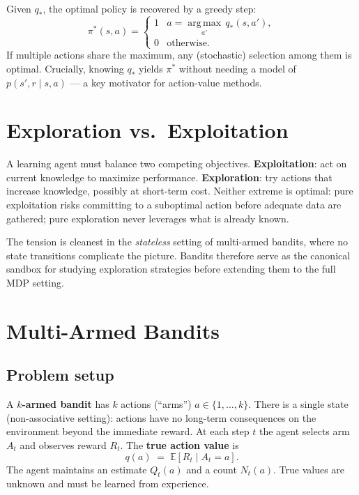 \documentclass[11pt, oneside]{book}
\newcommand{\E}{\mathbb{E}}              %
\newcommand{\argmax}{\operatorname*{arg\,max}}
\newcommand{\qstar}{q_{*}}               %
\begin{document}
Given $\qstar$, the optimal policy is recovered by a greedy step:
\[
  \pi^*(s, a) =
  \begin{cases}
    1 & a = \argmax_{a'}\, \qstar(s, a'), \\
    0 & \text{otherwise.}
  \end{cases}
\]
If multiple actions share the maximum, any (stochastic) selection among them is optimal.
Crucially, knowing $\qstar$ yields $\pi^*$ without needing a model of
$p(s',r \mid s,a)$ --- a key motivator for action-value methods.

\section{Exploration vs.\ Exploitation}

A learning agent must balance two competing objectives.
\textbf{Exploitation}: act on current knowledge to maximize performance.
\textbf{Exploration}: try actions that increase knowledge, possibly at short-term cost.
Neither extreme is optimal: pure exploitation risks committing to a suboptimal action
before adequate data are gathered; pure exploration never leverages what is already known.

The tension is cleanest in the \emph{stateless} setting of multi-armed bandits, where
no state transitions complicate the picture.
Bandits therefore serve as the canonical sandbox for studying exploration strategies
before extending them to the full MDP setting.

\section{Multi-Armed Bandits}

\subsection{Problem setup}

\begin{defbox}[title={$k$-Armed Bandit}]
A \textbf{$k$-armed bandit} has $k$ actions (``arms'') $a \in \{1,\dots,k\}$.
There is a single state (non-associative setting): actions have no long-term
consequences on the environment beyond the immediate reward.
At each step $t$ the agent selects arm $A_t$ and observes reward $R_t$.
The \textbf{true action value} is
\[
  q(a) \;=\; \E[R_t \mid A_t = a].
\]
The agent maintains an estimate $Q_t(a)$ and a count $N_t(a)$.
True values are unknown and must be learned from experience.
\end{defbox}
\end{document}
